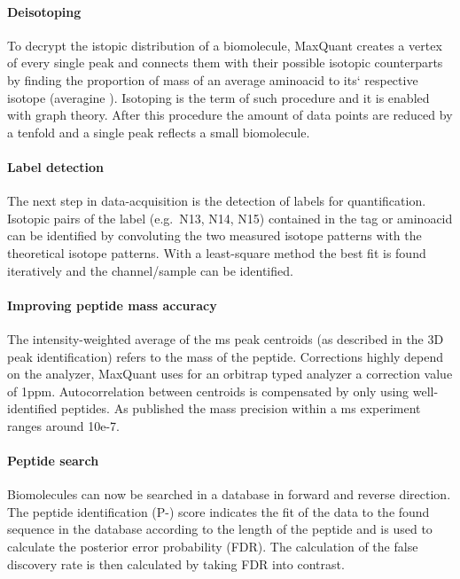 \documentclass[
]{article}
\begin{document}
\hypertarget{deisotoping}{%
\paragraph{Deisotoping}\label{deisotoping}}

To decrypt the istopic distribution of a biomolecule, MaxQuant creates a
vertex of every single peak and connects them with their possible
isotopic counterparts by finding the proportion of mass of an average
aminoacid to its` respective isotope (averagine \citep{Senko1995}).
Isotoping is the term of such procedure and it is enabled with graph
theory. After this procedure the amount of data points are reduced by a
tenfold and a single peak reflects a small biomolecule.

\hypertarget{label-detection}{%
\paragraph{Label detection}\label{label-detection}}

The next step in data-acquisition is the detection of labels for
quantification. Isotopic pairs of the label (e.g.~N13, N14, N15)
contained in the tag or aminoacid can be identified by convoluting the
two measured isotope patterns with the theoretical isotope patterns.
With a least-square method the best fit is found iteratively and the
channel/sample can be identified.

\hypertarget{improving-peptide-mass-accuracy}{%
\paragraph{Improving peptide mass
accuracy}\label{improving-peptide-mass-accuracy}}

The intensity-weighted average of the ms peak centroids (as described in
the 3D peak identification) refers to the mass of the peptide.
Corrections highly depend on the analyzer, MaxQuant uses for an orbitrap
typed analyzer a correction value of 1ppm. Autocorrelation between
centroids is compensated by only using well-identified peptides. As
published the mass precision within a ms experiment ranges around 10e-7.

\hypertarget{peptide-search}{%
\paragraph{Peptide search}\label{peptide-search}}

Biomolecules can now be searched in a database in forward and reverse
direction. The peptide identification (P-) score indicates the fit of
the data to the found sequence in the database according to the length
of the peptide and is used to calculate the posterior error probability
(FDR). The calculation of the false discovery rate is then calculated by
taking FDR into contrast.
\end{document}
